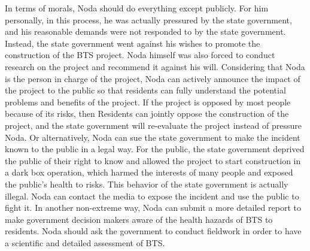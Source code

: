 \documentclass[a4paper,11pt]{article}
\begin{document}
In terms of morals, Noda should do everything except publicly. For him personally, in this process, he was actually pressured by the state government, and his reasonable demands were not responded to by the state government. Instead, the state government went against his wishes to promote the construction of the BTS project. Noda himself was also forced to conduct research on the project and recommend it against his will. Considering that Noda is the person in charge of the project, Noda can actively announce the impact of the project to the public so that residents can fully understand the potential problems and benefits of the project. If the project is opposed by most people because of its risks, then Residents can jointly oppose the construction of the project, and the state government will re-evaluate the project instead of pressure Noda. Or alternatively, Noda can sue the state government to make the incident known to the public in a legal way. For the public, the state government deprived the public of their right to know and allowed the project to start construction in a dark box operation, which harmed the interests of many people and exposed the public's health to risks. This behavior of the state government is actually illegal. Noda can contact the media to expose the incident and use the public to fight it. In another non-extreme way, Noda can submit a more detailed report to make government decision makers aware of the health hazards of BTS to residents. Noda should ask the government to conduct fieldwork in order to have a scientific and detailed assessment of BTS.
\newpage
\setcounter{page}{1} %



\clearpage
%
%
\end{document}
